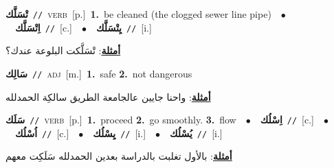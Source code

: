 \documentclass[10pt,a4paper,twoside]{article} %
\begin{document}
\begin{multicols}{2}
{\setlength\topsep{0pt}\textbf{\foreignlanguage{arabic}{تْسَلَّك}}\ {\color{gray}\texttt{//}\color{black}}\ \textsc{verb}\ [p.]\ \textbf{1.}~be cleaned (the clogged sewer line pipe)\ \ $\bullet$\ \ \setlength\topsep{0pt}\textbf{\foreignlanguage{arabic}{اِتْسَلَّك}}\ {\color{gray}\texttt{//}\color{black}}\ [c.]\ \ $\bullet$\ \ \setlength\topsep{0pt}\textbf{\foreignlanguage{arabic}{يِتْسَلَّك}}\ {\color{gray}\texttt{//}\color{black}}\ [i.]\  \begin{flushright}\color{gray}\foreignlanguage{arabic}{\textbf{\underline{\foreignlanguage{arabic}{أمثلة}}}: تْسَلَّكت البلوعة عندك؟}\end{flushright}\color{black}} \vspace{2mm}

{\setlength\topsep{0pt}\textbf{\foreignlanguage{arabic}{سَالِك}}\ {\color{gray}\texttt{//}\color{black}}\ \textsc{adj}\ [m.]\ \textbf{1.}~safe  \textbf{2.}~not dangerous\  \begin{flushright}\color{gray}\foreignlanguage{arabic}{\textbf{\underline{\foreignlanguage{arabic}{أمثلة}}}: واحنا جايين عالجامعة الطريق سالكِة الحمدلله}\end{flushright}\color{black}} \vspace{2mm}

{\setlength\topsep{0pt}\textbf{\foreignlanguage{arabic}{سَلَك}}\ {\color{gray}\texttt{//}\color{black}}\ \textsc{verb}\ [p.]\ \textbf{1.}~proceed  \textbf{2.}~go smoothly.  \textbf{3.}~flow\ \ $\bullet$\ \ \setlength\topsep{0pt}\textbf{\foreignlanguage{arabic}{اِسْلُك}}\ {\color{gray}\texttt{//}\color{black}}\ [c.]\ \ $\bullet$\ \ \setlength\topsep{0pt}\textbf{\foreignlanguage{arabic}{اُسْلُك}}\ {\color{gray}\texttt{//}\color{black}}\ [c.]\ \ $\bullet$\ \ \setlength\topsep{0pt}\textbf{\foreignlanguage{arabic}{يِسْلُك}}\ {\color{gray}\texttt{//}\color{black}}\ [i.]\ \ $\bullet$\ \ \setlength\topsep{0pt}\textbf{\foreignlanguage{arabic}{يُسْلُك}}\ {\color{gray}\texttt{//}\color{black}}\ [i.]\  \begin{flushright}\color{gray}\foreignlanguage{arabic}{\textbf{\underline{\foreignlanguage{arabic}{أمثلة}}}: بالأول تغلبت بالدراسة بعدين الحمدلله سَلَكِت معهم}\end{flushright}\color{black}} \vspace{2mm}


\end{multicols}
\end{document}
